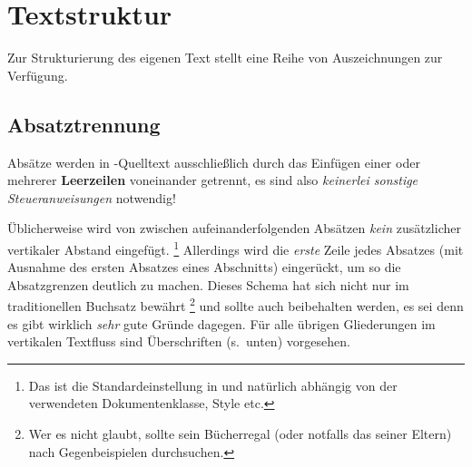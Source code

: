 \section{Textstruktur}

Zur Strukturierung des eigenen Text stellt \latex eine Reihe von Auszeichnungen zur Verfügung.


\subsection{Absatztrennung}

Absätze werden in {\latex}-Quelltext ausschließlich durch das
Einfügen einer oder mehrerer \textbf{Leerzeilen} voneinander
getrennt, es sind also \emph{keinerlei sonstige Steueranweisungen}
notwendig!
%
\begin{center}
\setlength{\fboxrule}{0.2mm}
\setlength{\fboxsep}{2mm}
\end{center}

Üblicherweise wird von {\latex} zwischen aufeinanderfolgenden 
Ab\-sätzen \emph{kein} zusätzlicher vertikaler Abstand eingefügt.%
\footnote{Das ist die Standardeinstellung in {\latex} und
natürlich abhängig von der verwendeten Dokumentenklasse, Style
etc.} 
Allerdings wird die
\emph{erste} Zeile jedes Absatzes (mit Ausnahme des ersten Absatzes
eines Abschnitts) eingerückt, um so die Absatzgrenzen deutlich zu
machen. Dieses Schema hat sich nicht nur im traditionellen
Buchsatz bewährt%
\footnote{Wer es nicht glaubt, sollte sein Bücherregal (oder notfalls das seiner Eltern) nach Gegenbeispielen durchsuchen.}
und sollte auch beibehalten werden, es sei denn
es gibt wirklich \emph{sehr} gute Gründe dagegen.
Für alle übrigen Gliederungen im vertikalen Textfluss sind Überschriften (s.\ unten) vorgesehen.



